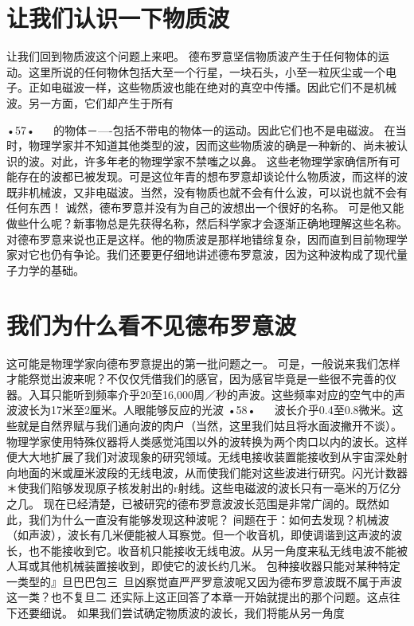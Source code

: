 \section{让我们认识一下物质波}

让我们回到物质波这个问题上来吧。
德布罗意坚信物质波产生于任何物体的运动。这里所说的任何物休包括大至一个行星，一块石头，小至一粒灰尘或一个电子。正如电磁波一样，这些物质波也能在绝对的真空中传播。因此它们不是机械波。另一方面，它们却产生于所有

•57•
  
的物体－—-包括不带电的物体一的运动。因此它们也不是电磁波。
在当时，物理学家并不知道其他类型的波，因而这些物质波的确是一种新的、尚未被认识的波。对此，许多年老的物理学家不禁嗤之以鼻。
这些老物理学家确信所有可能存在的波都已被发现。可是这位年青的想布罗意却谈论什么物质波，而这样的波既非机械波，又非电磁波。当然，没有物质也就不会有什么波，可以说也就不会有任何东西！
诚然，德布罗意并没有为自己的波想出一个很好的名称。
可是他又能做些什么呢？新事物总是先获得名称，然后科学家才会逐渐正确地理解这些名称。
对德布罗意来说也正是这样。他的物质波是那样地错综复杂，因而直到目前物理学家对它也仍有争论。我们还要更仔细地讲述德布罗意波，因为这种波构成了现代量子力学的基础。

\section{我们为什么看不见德布罗意波}

这可能是物理学家向德布罗意提出的第一批问题之一。
可是，一般说来我们怎样才能祭觉出波来呢？不仅仅凭借我们的感官，因为感官毕竟是一些很不完善的仪器。入耳只能听到频率介乎20至16,000周／秒的声波。这些频率对应的空气中的声波波长为17米至2厘米。人眼能够反应的光波
•58•
  
波长介乎0.4至0.8微米。这些就是自然界赋与我们通向波的肉户（当然，这里我们姑且将水面波撇开不谈）。
物理学家使用特殊仪器将人类感觉沌围以外的波转换为两个肉口以内的波长。这样便大大地扩展了我们对波现象的研究领域。无线电接收装置能接收到从宇宙深处射向地面的米或厘米波段的无线电波，从而使我们能对这些波进行研究。闪光计数器＊使我们陷够发现原子核发射出的r射线。这些电磁波的波长只有一亳米的万亿分之几。
现在已经清楚，已被研究的德布罗意波波长范围是非常广阔的。既然如此，我们为什么一直没有能够发现这种波呢？
间题在于：如何去发现？机械波（如声波），波长有几米便能被人耳察觉。但一个收音机，即使调谐到这声波的波长，也不能接收到它。收音机只能接收无线电波。从另一角度来私无线电波不能被人耳或其他机械装置接收到，即使它的波长约几米。
包种接收器只能对某种特定一类型的』旦巴巴包三~旦凶察觉直严严罗意波呢又因为德布罗意波既不属于声波这一类？也不复旦二
还实际上这正回答了本章一开始就提出的那个问题。这点往下还要细说。
如果我们尝试确定物质波的波长，我们将能从另一角度

